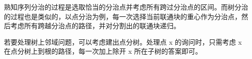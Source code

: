 熟知序列分治的过程是选取恰当的分治点并考虑所有跨过分治点的区间。而树分治的过程也是类似的，以点分治为例，每一次选择当前联通块的重心作为分治点，然后考虑所有跨越分治点的路径，并对分割出的联通块递归。

若要处理树上邻域问题，可以考虑建出点分树。处理点 x 的询问时，只需考虑 x 在点分树上到根的路径，每一次加上除开 x 所在子树的答案即可。

\inputminted{cpp}{src/data structure/tree-divide.cpp}